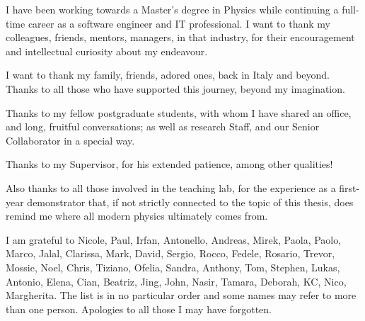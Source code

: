 I have been working towards a Master's degree in Physics
while continuing a full-time career as a software engineer and IT professional. 
I want to thank my colleagues, friends, mentors, managers, in that industry,
for their encouragement and intellectual curiosity about my endeavour. 

I want to thank my family, friends, adored ones, back in Italy and beyond.
Thanks to all those who have supported this journey, beyond my imagination.

Thanks to my fellow postgraduate students, with whom I have shared
an office, and long, fruitful conversations;
as well as research Staff, and our Senior Collaborator in a special way. 

Thanks to my Supervisor, for his extended patience, among other qualities!

Also thanks to all those involved in the teaching lab, 
for the experience as a first-year demonstrator that, 
if not strictly connected to the topic of this thesis, 
does remind me where all modern physics ultimately comes from.

I am grateful to Nicole, Paul, Irfan, Antonello, Andreas, Mirek, Paola, Paolo, Marco,
Jalal, Clarissa, Mark, David, Sergio, Rocco, Fedele, Rosario, Trevor, Mossie, Noel, Chris, Tiziano, Ofelia,
Sandra, Anthony, Tom, Stephen, Lukas, Antonio, Elena, Cian, Beatriz, Jing, John, Nasir, Tamara, 
Deborah, KC, Nico, Margherita. The list is in no particular order and some names may refer to more than one person.
Apologies to all those I may have forgotten.
